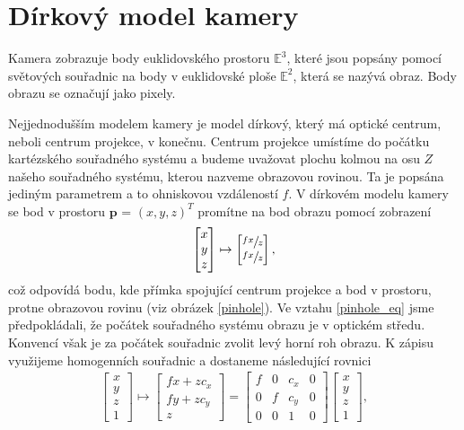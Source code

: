 \documentclass[twoside]{ctuthesis}
\newcommand{\tl}[1]{$\mathbf{#1}$}
\begin{document}
\section{Dírkový model kamery}
Kamera zobrazuje body euklidovského prostoru $\mathbb{E}^3$, které jsou popsány pomocí světových souřadnic na body v euklidovské ploše $\mathbb{E}^2$, která se nazývá obraz. Body obrazu se označují jako pixely. 

Nejjednodušším modelem kamery je model dírkový, který má optické centrum, neboli centrum projekce, v konečnu. Centrum projekce umístíme do počátku kartézského souřadného systému a budeme uvažovat plochu kolmou na osu $Z$ našeho souřadného systému, kterou nazveme obrazovou rovinou. Ta je popsána jediným parametrem a to ohniskovou vzdáleností $f$. V dírkovém modelu kamery se bod v prostoru \tl{p} = $(x,y,z)^T$ promítne na bod obrazu pomocí zobrazení
\begin{align}
    \begin{bmatrix} x \\ y \\ z \end{bmatrix} \mapsto \begin{bmatrix} \sfrac{fx}{z} \\ \sfrac{fx}{z} \end{bmatrix},
    \label{pinhole_eq}
\end{align}
což odpovídá bodu, kde přímka spojující centrum projekce a bod v prostoru, protne obrazovou rovinu (viz obrázek \ref{pinhole}). Ve vztahu \ref{pinhole_eq} jsme předpokládali, že počátek souřadného systému obrazu je v optickém středu. Konvencí však je za počátek souřadnic zvolit levý horní roh obrazu. K zápisu využijeme homogenních souřadnic a dostaneme následující rovnici 
\begin{align}
    \begin{bmatrix} x \\ y \\ z \\ 1 \end{bmatrix} \mapsto \begin{bmatrix} fx + zc_x \\ fy + zc_y \\ z \end{bmatrix} = \begin{bmatrix} f & 0 & c_x & 0 \\ 0 & f & c_y & 0 \\ 0 & 0 & 1 &0 \end{bmatrix} \begin{bmatrix} x \\ y \\ z \\ 1 \end{bmatrix},
    \label{eq:pinhole_homogenous}
\end{align}
\end{document}
